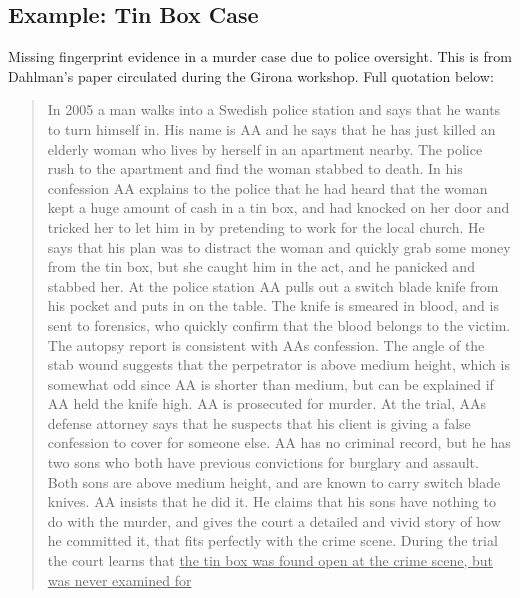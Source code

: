 \documentclass[
  10pt,
  dvipsnames,enabledeprecatedfontcommands]{scrartcl}
\begin{document}

\hypertarget{example-tin-box-case}{%
\subsection{Example: Tin Box Case}\label{example-tin-box-case}}

Missing fingerprint evidence in a murder case due to police oversight.
This is from Dahlman's paper circulated during the Girona workshop.
Full quotation below:

\begin{quote}
In 2005 a man walks into a Swedish police station and says that he wants to turn himself in. His
name is AA and he says that he has just killed an elderly woman who lives by herself in an
apartment nearby. The police rush to the apartment and find the woman stabbed to death. In
his confession AA explains to the police that he had heard that the woman kept a huge amount
of cash in a tin box, and had knocked on her door and tricked her to let him in by pretending to
work for the local church. He says that his plan was to distract the woman and quickly grab
some money from the tin box, but she caught him in the act, and he panicked and stabbed her.
At the police station AA pulls out a switch blade knife from his pocket and puts in on the table.
The knife is smeared in blood, and is sent to forensics, who quickly confirm that the blood
belongs to the victim. The autopsy report is consistent with AAs confession. The angle of the
stab wound suggests that the perpetrator is above medium height, which is somewhat odd
since AA is shorter than medium, but can be explained if AA held the knife high. AA is
prosecuted for murder. At the trial, AAs defense attorney says that he suspects that his client
is giving a false confession to cover for someone else. AA has no criminal record, but he has
two sons who both have previous convictions for burglary and assault. Both sons are above
medium height, and are known to carry switch blade knives. AA insists that he did it. He claims
that his sons have nothing to do with the murder, and gives the court a detailed and vivid story
of how he committed it, that fits perfectly with the crime scene. During the trial the court
learns that \underline{the tin box was found open at the crime scene, but was never examined for
}
\end{quote}
\end{document}
